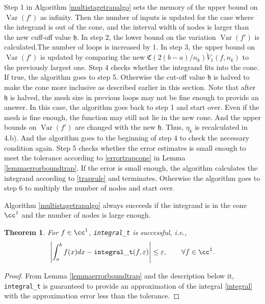 \documentclass{iitthesis}
\DeclareMathOperator{\Var}{Var}
\newtheorem{theorem}{Theorem}
\theoremstyle{definition}
\theoremstyle{remark}
\begin{document}
Step 1 in Algorithm \ref{multistagetrapalgo} sets the memory of the upper bound on $\Var(f')$ as infinity. Then the number of inputs is updated for the case where the integrand is out of the cone, and the interval width of nodes is larger than the new cuff-off value $\mathfrak{h}$. In step 2, the lower bound on the variation $\Var(f')$ is calculated.The number of loops is increased by 1. In step 3, the upper bound on $\Var(f')$ is updated by comparing the new $\mathfrak{C}(2(b-a)/n_{k})\widetilde{V}_1(f,n_k)$ to the previously largest one. Step 4 checks whether the integrand fits into the cone. If true, the algorithm goes to step 5. Otherwise the cut-off value $\mathfrak{h}$ is halved to make the cone more inclusive as described earlier in this section. Note that after $\mathfrak{h}$ is halved, the mesh size in previous loops may not be fine enough to provide an answer. In this case, the algorithm goes back to step 1 and start over. Even if the mesh is fine enough, the function may still not lie in the new cone. And the upper bounds on $\Var(f')$ are changed with the new $\mathfrak{h}$. Thus, $\eta_{k}$ is recalculated in 4.b). And the algorithm goes to the beginning of step 4 to check the necessary condition again. Step 5 checks whether the error estimates is small enough to meet the tolerance according to \eqref{errortrapcone} in Lemma \ref{lemmaerrorboundtrap}. If the error is small enough, the algorithm calculates the integrand according to \eqref{traprule} and terminates. Otherwise the algorithm goes to step 6 to multiply the number of nodes and start over.

Algorithm \ref{multistagetrapalgo} always succeeds if the integrand is in the cone $\cc^1$ and the number of nodes is large enough.
\begin{theorem}\label{thmTrap}
    For $f \in \cc^1$, {\tt integral\_t} is successful, i.e.,
    \begin{equation*}
      \left|\int_{a}^{b}f(x)dx-{\tt integral\_t}(f,\varepsilon)\right|\le\varepsilon, \qquad \forall f\in \cc^1.
    \end{equation*}
\end{theorem}
\begin{proof}
  From Lemma \ref{lemmaerrorboundtrap} and the description below it, {\tt integral\_t} is guaranteed to provide an approximation of the integral \eqref{integral} with the approximation error less than the tolerance.
\end{proof}
\end{document}
